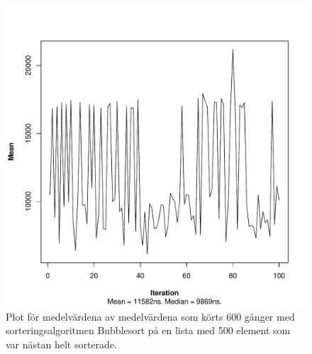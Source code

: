 \documentclass[a4paper]{article}
\begin{document}
\begin{figure}[H]
	\begin{center}
		\includegraphics[scale=0.4]{output/500/AlmostSorted/bubbleSort_almost_sorted_500_600_100.pdf}
		\caption{Plot för medelvärdena av medelvärdena som körts 600 gånger med sorteringsalgoritmen Bubblesort på en lista med 500 element som var nästan helt sorterade.}
	\end{center}
\end{figure}
\end{document}
